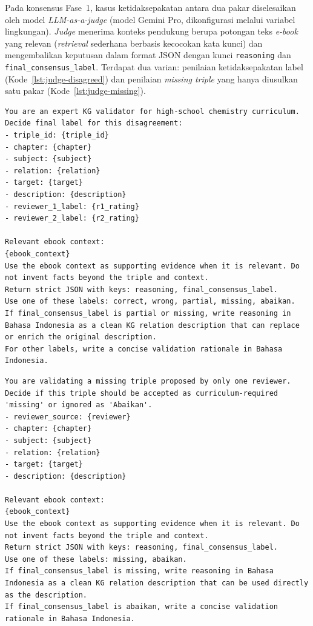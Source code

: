 \documentclass[main]{subfiles}
\begin{document}
Pada konsensus Fase~1, kasus ketidaksepakatan antara dua pakar diselesaikan oleh
model \textit{LLM-as-a-judge} (model Gemini Pro, dikonfigurasi melalui variabel
lingkungan). \textit{Judge} menerima konteks pendukung berupa potongan teks
\textit{e-book} yang relevan (\textit{retrieval} sederhana berbasis kecocokan
kata kunci) dan mengembalikan keputusan dalam format JSON dengan kunci
\texttt{reasoning} dan \texttt{final\_consensus\_label}. Terdapat dua varian:
penilaian ketidaksepakatan label (Kode~\ref{lst:judge-disagreed}) dan penilaian
\textit{missing triple} yang hanya diusulkan satu pakar (Kode~\ref{lst:judge-missing}).

\begin{lstlisting}[style=promptbox,caption={Prompt judge untuk ketidaksepakatan label rating.},label={lst:judge-disagreed}]
You are an expert KG validator for high-school chemistry curriculum.
Decide final label for this disagreement:
- triple_id: {triple_id}
- chapter: {chapter}
- subject: {subject}
- relation: {relation}
- target: {target}
- description: {description}
- reviewer_1_label: {r1_rating}
- reviewer_2_label: {r2_rating}

Relevant ebook context:
{ebook_context}
Use the ebook context as supporting evidence when it is relevant. Do not invent facts beyond the triple and context.
Return strict JSON with keys: reasoning, final_consensus_label.
Use one of these labels: correct, wrong, partial, missing, abaikan.
If final_consensus_label is partial or missing, write reasoning in Bahasa Indonesia as a clean KG relation description that can replace or enrich the original description.
For other labels, write a concise validation rationale in Bahasa Indonesia.
\end{lstlisting}

\begin{lstlisting}[style=promptbox,caption={Prompt judge untuk missing triple yang diusulkan satu pakar.},label={lst:judge-missing}]
You are validating a missing triple proposed by only one reviewer.
Decide if this triple should be accepted as curriculum-required 'missing' or ignored as 'Abaikan'.
- reviewer_source: {reviewer}
- chapter: {chapter}
- subject: {subject}
- relation: {relation}
- target: {target}
- description: {description}

Relevant ebook context:
{ebook_context}
Use the ebook context as supporting evidence when it is relevant. Do not invent facts beyond the triple and context.
Return strict JSON with keys: reasoning, final_consensus_label.
Use one of these labels: missing, abaikan.
If final_consensus_label is missing, write reasoning in Bahasa Indonesia as a clean KG relation description that can be used directly as the description.
If final_consensus_label is abaikan, write a concise validation rationale in Bahasa Indonesia.
\end{lstlisting}
\end{document}
